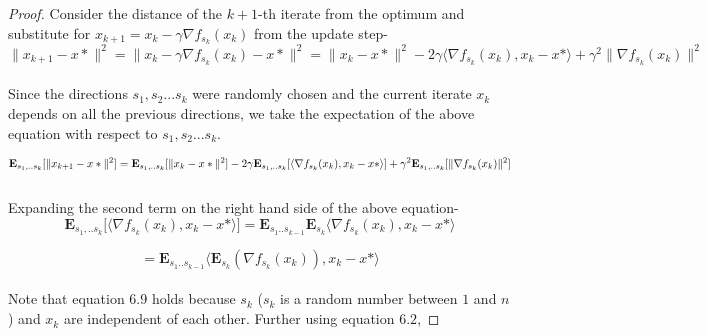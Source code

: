 \documentclass[12pt]{report}
\begin{document}
\begin{proof}
Consider the distance of the $k+1$-th iterate from the optimum and substitute for $x_{k+1} = x_{k} - \gamma \nabla f_{s_{k}}(x_{k})$ from the update step-\\
\begin{equation}
\|x_{k+1}-x*\|^{2} = \|x_{k} - \gamma \nabla f_{s_{k}}(x_{k})-x*\|^{2} = \|x_{k}-x*\|^{2} - 2\gamma \langle \nabla f_{s_{k}}(x_k), x_{k}-x*\rangle + \gamma^2\|\nabla f_{s_{k}}(x_k)\|^2
\end{equation}\\

Since the directions $s_1, s_2... s_k$ were randomly chosen and the current iterate $x_{k}$ depends on all the previous directions, we take the expectation of the above equation with respect to $s_1,s_2...s_k$.

\begin{equation}
\mathbf{E}_{s_1,..s_k} \lbrack\|x_{k+1}-x*\|^{2}\rbrack = \mathbf{E}_{s_1,..s_k}\lbrack\|x_{k}-x*\|^2\rbrack - 2\gamma \mathbf{E}_{s_1,..s_k}\lbrack \langle \nabla f_{s_k}(x_k), x_{k}-x* \rangle \rbrack + \gamma^2 \mathbf{E}_{s_1,..s_k} \lbrack \| \nabla f_{s_k}(x_k)\|^2 \rbrack
\\
\end{equation}
\\
Expanding the second term on the right hand side of the above equation-\\

\begin{equation}
\mathbf{E}_{s_1,..s_k}\lbrack \langle \nabla f_{s_k}(x_k), x_{k}-x* \rangle \rbrack = \mathbf{E}_{s_{1}..s_{k-1}}\mathbf{E}_{s_{k}}\langle \nabla f_{s_{k}}(x_{k}),x_{k}-x*\rangle
\end{equation}

\begin{equation}
 = \mathbf{E}_{s_{1}..s_{k-1}}\langle \mathbf{E}_{s_{k}}(\nabla f_{s_{k}}(x_{k})),x_{k}-x*\rangle 
\end{equation}
\\
Note that equation 6.9 holds because $s_{k}$ ($s_{k}$ is a random number between $1$ and $n$) and $x_{k}$ are independent of each other. Further using equation $6.2$,


\end{proof}
\end{document}
